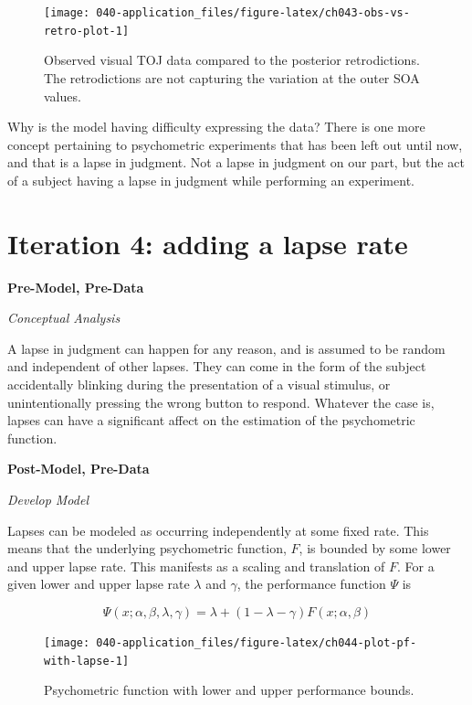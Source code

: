 \documentclass[11pt, oneside, openany]{scrbook}
\begin{document}
\begin{figure}

{\centering \texttt{[image: 040-application\_files/figure-latex/ch043-obs-vs-retro-plot-1]} 

}

\caption{Observed visual TOJ data compared to the posterior retrodictions. The retrodictions are not capturing the variation at the outer SOA values.}\label{fig:ch043-obs-vs-retro-plot}
\end{figure}

Why is the model having difficulty expressing the data? There is one more concept pertaining to psychometric experiments that has been left out until now, and that is a lapse in judgment. Not a lapse in judgment on our part, but the act of a subject having a lapse in judgment while performing an experiment.

\hypertarget{iter4}{%
\section{Iteration 4: adding a lapse rate}\label{iter4}}

\textbf{Pre-Model, Pre-Data}

\emph{Conceptual Analysis}

A lapse in judgment can happen for any reason, and is assumed to be random and independent of other lapses. They can come in the form of the subject accidentally blinking during the presentation of a visual stimulus, or unintentionally pressing the wrong button to respond. Whatever the case is, lapses can have a significant affect on the estimation of the psychometric function.

\textbf{Post-Model, Pre-Data}

\emph{Develop Model}

Lapses can be modeled as occurring independently at some fixed rate. This means that the underlying psychometric function, \(F\), is bounded by some lower and upper lapse rate. This manifests as a scaling and translation of \(F\). For a given lower and upper lapse rate \(\lambda\) and \(\gamma\), the performance function \(\Psi\) is

\[
\Psi(x; \alpha, \beta, \lambda, \gamma) = \lambda + (1 - \lambda - \gamma) F(x; \alpha, \beta)
\]

\begin{figure}

{\centering \texttt{[image: 040-application\_files/figure-latex/ch044-plot-pf-with-lapse-1]} 

}

\caption{Psychometric function with lower and upper performance bounds.}\label{fig:ch044-plot-pf-with-lapse}
\end{figure}
\end{document}

